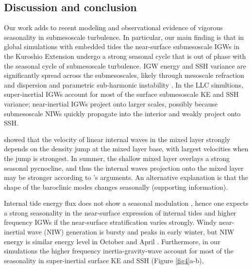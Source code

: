 \documentclass[grl]{agutex2015}
\begin{document}
\begin{article}
\section{Discussion and conclusion}
Our work adds to recent modeling \citep[e.g., ][]{sasaki_etal2014}
and observational \citep[e.g., ][]{callies_etal2015,buckingham_etal2016} evidence of vigorous seasonality in
submesoscale turbulence. In particular, our main finding is that in global simulations with embedded tides the
near-surface submesoscale IGWs in the Kuroshio Extension undergo
a strong seasonal cycle that is out of phase with the seasonal cycle of
submesoscale turbulence. IGW energy and SSH variance are significantly spread across
the submesoscales, likely through mesoscale refraction and dispersion \citep[e.g.,][and references therein]{ponte_klein2015,alford_etal2016}
 and parametric
sub-harmonic instability \citep[e.g., ][]{mackinnon_winters2005}.
In the LLC simultions,
super-inertial IGWs account for most of the surface submesoscale KE and SSH variance;
near-inertial IGWs project onto larger scales, possibly because submesoscale
NIWs quickly propagate into the interior and weakly project onto SSH.


\cite{dasaro1978} showed that the velocity of linear internal waves
in the mixed layer strongly depends on the density jump at the mixed layer
base, with largest velocities when the jump is strongest.
In summer, the shallow mixed layer overlays a strong seasonal pycnocline,
and thus the internal waves projection onto the mixed layer may be stronger
according to \cite{dasaro1978}'s arguments. An
alternative explanation is that the shape of the baroclinic modes
changes seasonally (supporting information).

Internal tide energy flux does not show a seasonal modulation \citep[e.g.,][]{alford2003},
hence one expects a strong seasonality in the near-surface
expression of internal tides and
higher frequency IGWs if the near-surface stratification varies strongly.
Windy near-inertial wave (NIW) generation is bursty and peaks in early winter, but
NIW energy is similar energy level in October and April
\citep{alford_etal2016}. Furthermore, in our simulations the higher frequency inertia-gravity-wave
account for most of the seasonality in super-inertial surface KE and SSH
(Figure \ref{fig4}a-b),


\end{article}
\end{document}
